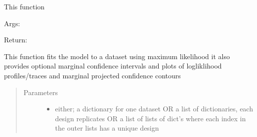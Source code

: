 \documentclass[letterpaper,10pt,english]{sphinxmanual}
\begin{document}
\begin{fulllineitems}
\begin{fulllineitems}
\label{\detokenize{nloed:nloed.model.Model.distribution_dict}}
\end{fulllineitems}


\begin{fulllineitems}
\label{\detokenize{nloed:nloed.model.Model.evaluate}}
This function

Args:

Return:

\end{fulllineitems}


\begin{fulllineitems}
\label{\detokenize{nloed:nloed.model.Model.fit}}
This function fits the model to a dataset using maximum likelihood
it also provides optional marginal confidence intervals
and plots of logliklihood profiles/traces and marginal projected confidence contours
\begin{quote}\begin{description}
\item[{Parameters}] \leavevmode\begin{itemize}
\item {} 
 \textendash{} either; a dictionary for one dataset OR a list of dictionaries,  each design replicates OR a list of lists of dict’s where each index in the outer lists has a unique design


\end{itemize}
\end{description}
\end{quote}
\end{fulllineitems}
\end{fulllineitems}
\end{document}
